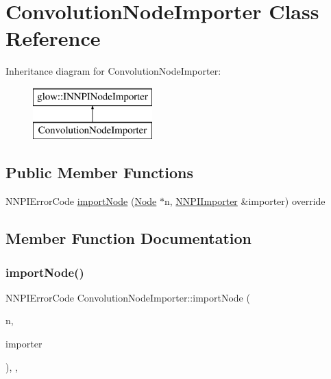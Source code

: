 \hypertarget{class_convolution_node_importer}{}\section{Convolution\+Node\+Importer Class Reference}
\label{class_convolution_node_importer}
Inheritance diagram for Convolution\+Node\+Importer\+:\begin{figure}[H]
\begin{center}
\leavevmode
\includegraphics[height=2.000000cm]{class_convolution_node_importer}
\end{center}
\end{figure}
\subsection*{Public Member Functions}
\begin{DoxyCompactItemize}
\item 
N\+N\+P\+I\+Error\+Code \hyperlink{class_convolution_node_importer_a3fb2af796bd7e7e002351ff2f98a83f4}{import\+Node} (\hyperlink{classglow_1_1_node}{Node} $\ast$n, \hyperlink{classglow_1_1_n_n_p_i_importer}{N\+N\+P\+I\+Importer} \&importer) override
\end{DoxyCompactItemize}


\subsection{Member Function Documentation}
\mbox{\label{class_convolution_node_importer_a3fb2af796bd7e7e002351ff2f98a83f4}} 
\subsubsection{\texorpdfstring{import\+Node()}{importNode()}}
{\footnotesize\ttfamily N\+N\+P\+I\+Error\+Code Convolution\+Node\+Importer\+::import\+Node (\begin{DoxyParamCaption}\item[{\hyperlink{classglow_1_1_node}{Node} $\ast$}]{n,  }\item[{\hyperlink{classglow_1_1_n_n_p_i_importer}{N\+N\+P\+I\+Importer} \&}]{importer }\end{DoxyParamCaption})\hspace{0.3cm}{\ttfamily [inline]}, {\ttfamily [override]}, {\ttfamily [virtual]}}

